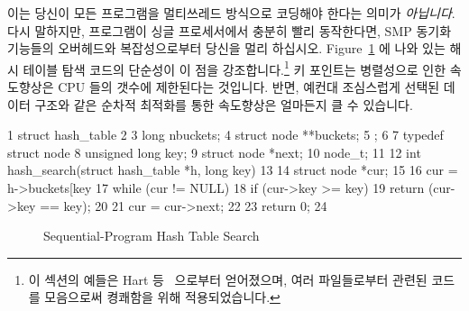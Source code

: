 이는 당신이 모든 프로그램을 멀티쓰레드 방식으로 코딩해야 한다는 의미가
\emph{아닙니다}.
다시 말하지만, 프로그램이 싱글 프로세서에서 충분히 빨리 동작한다면, SMP 동기화
기능들의 오버헤드와 복잡성으로부터 당신을 멀리 하십시오.
Figure~\ref{fig:SMPdesign:Sequential-Program Hash Table Search} 에 나와 있는
해시 테이블 탐색 코드의 단순성이 이 점을 강조합니다.\footnote{
이 섹션의 예들은 Hart 등~\cite{ThomasEHart2006a} 으로부터 얻어졌으며, 여러
	파일들로부터 관련된 코드를 모음으로써 켱쾌함을 위해 적용되었습니다.}
키 포인트는 병렬성으로 인한 속도향상은 CPU 들의 갯수에 제한된다는 것입니다.
반면, 예컨대 조심스럽게 선택된 데이터 구조와 같은 순차적 최적화를 통한
속도향상은 얼마든지 클 수 있습니다.

{ \scriptsize
\begin{verbbox}
  1 struct hash_table
  2 {
  3   long nbuckets;
  4   struct node **buckets;
  5 };
  6
  7 typedef struct node {
  8   unsigned long key;
  9   struct node *next;
 10 } node_t;
 11
 12 int hash_search(struct hash_table *h, long key)
 13 {
 14   struct node *cur;
 15
 16   cur = h->buckets[key %
 17   while (cur != NULL) {
 18     if (cur->key >= key) {
 19       return (cur->key == key);
 20     }
 21     cur = cur->next;
 22   }
 23   return 0;
 24 }
\end{verbbox}
}
\begin{figure}[tbhp]
\centering
\theverbbox
\caption{Sequential-Program Hash Table Search}
\label{fig:SMPdesign:Sequential-Program Hash Table Search}
\end{figure}


